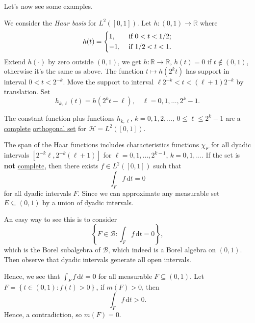 Let's now see some examples.

\begin{eg}
	We consider the \emph{Haar basis} for \(L^2([0, 1])\). Let \(h\colon (0, 1)\to \mathbb{R} \) where
	\[
		h(t) = \begin{dcases}
			1,  & \text{ if } 0 < t < 1 / 2; \\
			-1, & \text{ if } 1 / 2 < t < 1.
		\end{dcases}
	\]
	Extend \(h(\cdot)\) by zero outside \((0, 1)\), we get \(h\colon \mathbb{R} \to \mathbb{R} \), \(h(t) = 0\) if \(t \notin (0, 1)\), otherwise it's the same as above. The function \(t\mapsto h(2^k t)\) has support in interval \(0 < t < 2^{-k}\). Move the support to interval \(\ell 2^{-k} < t < (\ell +1)2^{-k}\) by translation. Set
	\[
		h_{k, \ell }(t) = h(2^{k}t - \ell ),\quad \ell = 0, 1, \ldots , 2^k - 1.
	\]

	The constant function plus functions \(h_{k, \ell }\), \(k = 0, 1, 2, \ldots  \), \(0 \leq \ell \leq 2^k - 1\) are a \hyperref[def:complete-system]{complete} \hyperref[def:orthogonal-system]{orthogonal set} for \(\mathcal{H} = L^2([0, 1])\).
\end{eg}
\begin{explanation}
	The span of the Haar functions includes characteristics functions \(\chi _F\) for all dyadic intervals \([2^{-k}\ell , 2^{-k}(\ell +1)]\) for \(\ell = 0, 1, \ldots  , 2^{k-1} \), \(k = 0, 1, \ldots\). If the set is \textbf{not} \hyperref[def:complete-system]{complete}, then there exists \(f\in L^2([0, 1])\) such that
	\[
		\int _F f\,\mathrm{d} t = 0
	\]
	for all dyadic intervals \(F\). Since we can approximate any measurable set \(E\subseteq (0, 1)\) by a union of dyadic intervals.
	\begin{intuition}
		An easy way to see this is to consider
		\[
			\left\{ F\in \mathcal{B} \colon \int _F f\,\mathrm{d} t = 0 \right\},
		\]
		which is the Borel subalgebra of \(\mathcal{B} \), which indeed is a Borel algebra on \((0, 1)\). Then observe that dyadic intervals generate all open intervals.
	\end{intuition}

	Hence, we see that \(\int _F f\,\mathrm{d} t= 0\) for all measurable \(F\subseteq (0, 1)\). Let \(F = \left\{ t\in (0, 1)\colon f(t) > 0 \right\} \), if \(m(F) > 0\), then
	\[
		\int _F f\,\mathrm{d} t > 0.
	\]
	Hence, a contradiction, so \(m(F) = 0\).
\end{explanation}

